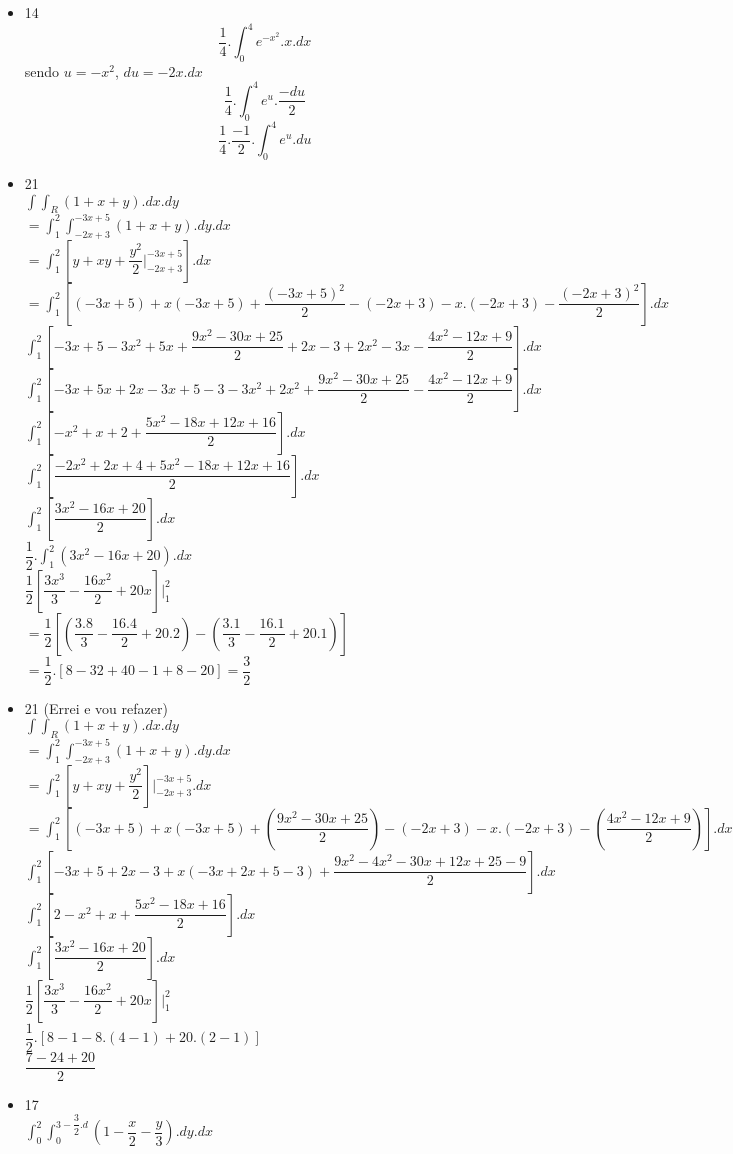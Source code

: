 \documentclass{article}
\begin{document}
\begin{itemize}
	\item 14
	$$\dfrac{1}{4}.\int_0^4 e^{-x^2}.x.dx$$
	sendo $u =-x^2$, $du = -2x.dx$
	$$\dfrac{1}{4}.\int_0^4 e^u.\dfrac{-du}{2}$$
	$$\dfrac{1}{4}.\dfrac{-1}{2}.\int_0^4 e^u.du$$
	
	\item 21\\
	
	$\int \int_R (1+x+y).dx.dy$\\
	$= \int_1^2 \int_{-2x+3}^{-3x+5} (1+x+y).dy.dx$\\
	$= \int_1^2[y+xy+\dfrac{y^2}{2}|_{-2x+3}^{-3x+5}].dx$\\
	$=\int_1^2[(-3x+5)+x(-3x+5)+\dfrac{(-3x+5)^2}{2}-(-2x+3)-x.(-2x+3)-\dfrac{(-2x+3)^2}{2}].dx$\\
	$\int_1^2[-3x+5-3x^2+5x+\dfrac{9x^2-30x+25}{2}+2x-3+2x^2-3x-\dfrac{4x^2-12x+9}{2}].dx$\\
	$\int_1^2[-3x+5x+2x-3x+5-3-3x^2+2x^2+\dfrac{9x^2-30x+25}{2}-\dfrac{4x^2-12x+9}{2}].dx$\\
	$\int_1^2[-x^2+x+2+\dfrac{5x^2-18x+12x+16}{2}].dx$\\
	$\int_1^2[\dfrac{-2x^2+2x+4+5x^2-18x+12x+16}{2}].dx$\\
	$\int_1^2[\dfrac{3x^2-16x+20}{2}].dx$\\
	$\dfrac{1}{2}.\int_1^2(3x^2-16x+20).dx$\\
	$\dfrac{1}{2}[\dfrac{3x^3}{3}-\dfrac{16x^2}{2}+20x]|_1^2$\\
	$=\dfrac{1}{2}[(\dfrac{3.8}{3}-\dfrac{16.4}{2}+20.2)-(\dfrac{3.1}{3}-\dfrac{16.1}{2}+20.1)]$\\
	$=\dfrac{1}{2}.[8-32+40-1+8-20]=\dfrac{3}{2}$
	\item 21 (Errei e vou refazer)\\
	$\int \int_R (1+x+y).dx.dy$\\
	$=\int_1^2\int_{-2x+3}^{-3x+5}(1+x+y).dy.dx$\\
	$=\int_1^2 [y+xy+\dfrac{y^2}{2}]|_{-2x+3}^{-3x+5}.dx$\\
	$=\int_1^2 [(-3x+5)+x(-3x+5)+(\dfrac{9x^2-30x+25}{2})-(-2x+3)-x.(-2x+3)-(\dfrac{4x^2-12x+9}{2})].dx$\\
	$\int_1^2 [-3x+5+2x-3+x(-3x+2x+5-3)+\dfrac{9x^2-4x^2-30x+12x+25-9}{2}].dx$
	$\int_1^2[2-x^2+x+\dfrac{5x^2-18x+16}{2}].dx$ \\
	$\int_1^2[\dfrac{3x^2-16x+20}{2}].dx$\\
	$\dfrac{1}{2}[\dfrac{3x^3}{3}-\dfrac{16x^2}{2}+20x]|_1^2$\\
	$\dfrac{1}{2}.[8-1-8.(4-1)+20.(2-1)]$\\
	$\dfrac{7-24+20}{2}$
	\item 17\\
	$\int_0^2 \int_0^{3-\dfrac{3}{2}.d} (1-\dfrac{x}{2}-\dfrac{y}{3}).dy.dx$\\
	

\end{itemize}
\end{document}
